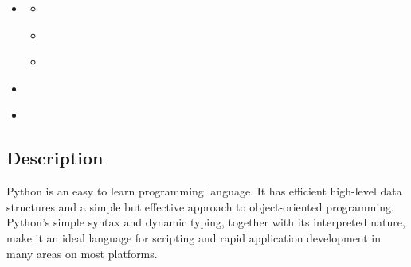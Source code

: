 \begin{sphinxShadowBox}
\begin{itemize}
\begin{itemize}
\begin{itemize}
\item {} 
\label{\detokenize{lesson/prg/python_intro:id49}}{\hyperref[\detokenize{lesson/prg/python_intro:lab-python-setup-for-futuresystems}]{}}

\end{itemize}

\item {} 
\label{\detokenize{lesson/prg/python_intro:id50}}{\hyperref[\detokenize{lesson/prg/python_intro:ecosystem}]{}}
\begin{itemize}
\item {} 
\label{\detokenize{lesson/prg/python_intro:id51}}{\hyperref[\detokenize{lesson/prg/python_intro:autoenv-directory-based-environments}]{}}

\item {} 
\label{\detokenize{lesson/prg/python_intro:id52}}{\hyperref[\detokenize{lesson/prg/python_intro:pypi}]{}}

\item {} 
\label{\detokenize{lesson/prg/python_intro:id53}}{\hyperref[\detokenize{lesson/prg/python_intro:alternative-installations}]{}}

\end{itemize}

\item {} 
\label{\detokenize{lesson/prg/python_intro:id54}}{\hyperref[\detokenize{lesson/prg/python_intro:useful-ecosystem-links}]{}}

\item {} 
\label{\detokenize{lesson/prg/python_intro:id55}}{\hyperref[\detokenize{lesson/prg/python_intro:resources}]{}}

\end{itemize}

\end{itemize}
\end{sphinxShadowBox}


\subsection{Description}
\label{\detokenize{lesson/prg/python_intro:description}}
Python is an easy to learn programming language. It has efficient
high-level data structures and a simple but effective approach to
object-oriented programming. Python’s simple syntax and dynamic
typing, together with its interpreted nature, make it an ideal
language for scripting and rapid application development in many areas
on most platforms.

